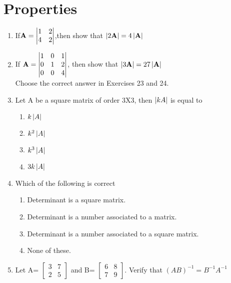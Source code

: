 \documentclass[journal,12pt,twocolumn]{IEEEtran}
\renewcommand\thesection{\arabic{section}}
\begin{document}
\section{Properties}
\renewcommand{\theequation}{\theenumi}
\begin{enumerate}[label=\thesection.\arabic*.,ref=\thesection.\theenumi]

\item If$ \mathbf{A} = \begin{vmatrix}1&2\\4&2\end{vmatrix}$,then show that  
$\left\vert2\mathbf{A}\right\vert=4\left\vert\mathbf{A}\right\vert$
\\
\solution 
%
\item If $\mathbf{A}=\begin{vmatrix}1&0&1\\0&1&2\\0&0&4\end{vmatrix}$, then show that $\left\vert3\mathbf{A}\right\vert=27\left\vert\mathbf{A}\right\vert$
\\
\solution 
%
Choose the correct answer in Exercises 23 and 24.
\item Let A be a square matrix of order 3X3, then 
$\left\vert kA\right\vert$ is equal to
\begin{enumerate}
\item $k\left\vert A\right\vert$
\item $k^2\left\vert A\right\vert$
\item $k^3\left\vert A\right\vert$
\item $3k\left\vert A\right\vert$
\end{enumerate} 
\item Which of the following is correct
\begin{enumerate}
\item Determinant is a square matrix.
\item Determinant is a number associated to a matrix.
\item Determinant is a number associated to a square matrix.
\item None of these.
\end{enumerate}

\item Let A=
$\begin{bmatrix}
3&7 \\ 2&5
\end{bmatrix}$ and B=
$\begin{bmatrix}
6&8 \\ 7&9
\end{bmatrix}.$ Verify that $(AB)^{-1}=B^{-1} A^{-1}$


\end{enumerate}
\end{document}
